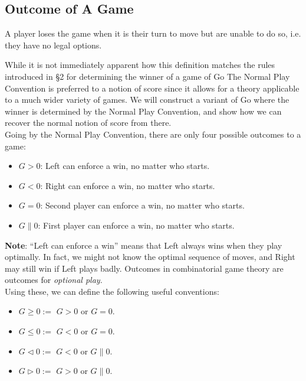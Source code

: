 \documentclass[../math194_paper.tex]{subfiles}
\begin{document}
\subsection{Outcome of A Game}

\begin{definition}
    A player loses the game when it is their turn to move but are unable to do so, i.e. they have
    no legal options.
\end{definition}
While it is not immediately apparent how this definition matches the rules introduced in \S 2
for determining the winner of a game of Go  The Normal Play Convention
is preferred to a notion of score since it allows for a theory applicable 
to a much wider variety of games. We will construct a variant of Go where the winner 
is determined by the Normal Play Convention, and show how we can recover the normal notion of
score from there. \\

Going by the Normal Play Convention, there are only four possible outcomes to a game:
\begin{itemize}
    \item $G > 0$: Left can enforce a win, no matter who starts.
    \item $G < 0$: Right can enforce a win, no matter who starts.
    \item $G = 0$: Second player can enforce a win, no matter who starts.
    \item $G \parallel 0$: First player can enforce a win, no matter who starts.
\end{itemize}
\textbf{Note}:  ``Left can enforce a win'' means that Left always wins when they play optimally.
In fact, we might not know the optimal sequence of moves, and Right may still win if Left plays badly.
Outcomes in combinatorial game theory are outcomes for \textit{optional play}.\\

Using these, we can define the following useful conventions:
\begin{itemize}
    \item $G \geq 0 :=$ $G > 0$ or $G = 0$.
    \item $G \leq 0 :=$ $G < 0$ or $G = 0$.
    \item $G \triangleleft 0 :=$ $G < 0$ or $G \parallel 0$.
    \item $G \triangleright 0 :=$  $G > 0$ or $G \parallel 0$.
\end{itemize}
\end{document}
